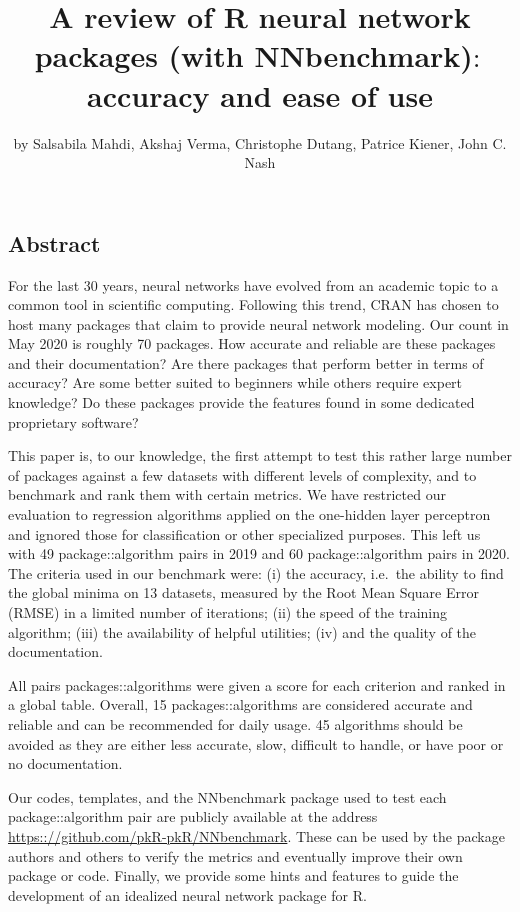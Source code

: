 \title{A review of R neural network packages (with NNbenchmark)\(:\) accuracy
and ease of use}
\author{by Salsabila Mahdi, Akshaj Verma, Christophe Dutang, Patrice Kiener, John C. Nash}

\maketitle


\hypertarget{abstract}{%
\subsection{Abstract}\label{abstract}}

For the last 30 years, neural networks have evolved from an academic
topic to a common tool in scientific computing. Following this trend,
CRAN has chosen to host many packages that claim to provide neural
network modeling. Our count in May 2020 is roughly 70 packages. How
accurate and reliable are these packages and their documentation? Are
there packages that perform better in terms of accuracy? Are some better
suited to beginners while others require expert knowledge? Do these
packages provide the features found in some dedicated proprietary
software?

This paper is, to our knowledge, the first attempt to test this rather
large number of packages against a few datasets with different levels of
complexity, and to benchmark and rank them with certain metrics. We have
restricted our evaluation to regression algorithms applied on the
one-hidden layer perceptron and ignored those for classification or
other specialized purposes. This left us with 49 package::algorithm
pairs in 2019 and 60 package::algorithm pairs in 2020. The criteria used
in our benchmark were: (i) the accuracy, i.e.~the ability to find the
global minima on 13 datasets, measured by the Root Mean Square Error
(RMSE) in a limited number of iterations; (ii) the speed of the training
algorithm; (iii) the availability of helpful utilities; (iv) and the
quality of the documentation.

All pairs packages::algorithms were given a score for each criterion and
ranked in a global table. Overall, 15 packages::algorithms are
considered accurate and reliable and can be recommended for daily usage.
45 algorithms should be avoided as they are either less accurate, slow,
difficult to handle, or have poor or no documentation.

Our codes, templates, and the NNbenchmark package used to test each
package::algorithm pair are publicly available at the address
\url{https:://github.com/pkR-pkR/NNbenchmark}. These can be used by the
package authors and others to verify the metrics and eventually improve
their own package or code. Finally, we provide some hints and features
to guide the development of an idealized neural network package for R.

